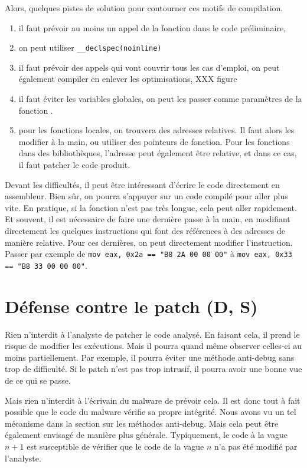 \documentclass{book}
\begin{document}
Alors, quelques pistes de solution pour contourner ces motifs de compilation. 
\begin{enumerate}
\item il faut prévoir au moins un appel de la fonction dans le code préliminaire,
\item on peut utiliser \texttt{__declspec(noinline) }
\item il faut prévoir des appels qui vont couvrir tous les cas d'emploi, on peut également compiler en enlever les optimisations, XXX figure
\item il faut éviter les variables globales, on peut les passer comme paramètres de la fonction .
\item pour les fonctions locales, on trouvera des adresses relatives. Il faut alors les modifier à la main, ou utiliser des pointeurs de fonction. Pour les fonctions dans des bibliothèques, l'adresse peut également être relative, et dans ce cas, il faut patcher le code produit. 
\end{enumerate}

Devant les difficultés, il peut être intéressant d'écrire le code directement en assembleur. Bien sûr, on pourra s'appuyer sur un code compilé pour aller plus vite. En pratique, si la fonction n'est pas très longue, cela peut aller rapidement.  Et souvent, il est nécessaire de faire une dernière passe à la main, en modifiant directement les quelques instructions qui font des références à des adresses de manière relative. Pour ces dernières, on peut directement modifier l'instruction. Passer par exemple de \texttt{mov eax, 0x2a == "B8 2A 00 00 00"} à \texttt{mov eax, 0x33 == "B8 33 00 00 00"}. 


\section{Défense contre le patch (D, S)}

Rien n'interdit à l'analyste de patcher le code analysé. En faisant cela, il prend le risque de modifier  les exécutions. Mais il pourra quand même observer celles-ci au moins partiellement. Par exemple, il pourra éviter une méthode anti-debug sans trop de difficulté. Si le patch n'est pas trop intrusif, il pourra avoir une bonne vue de ce qui se passe. 

Mais rien n'interdit à l'écrivain du malware de prévoir cela. Il est donc tout à fait possible que le code du malware vérifie sa propre intégrité. Nous avons vu un tel mécanisme dans la section sur les méthodes anti-debug. Mais cela peut être également envisagé de manière plus générale.  Typiquement, le code à la vague $n+1$ est susceptible de vérifier que le code de la vague $n$ n'a pas été modifié par l'analyste.
\end{document}
